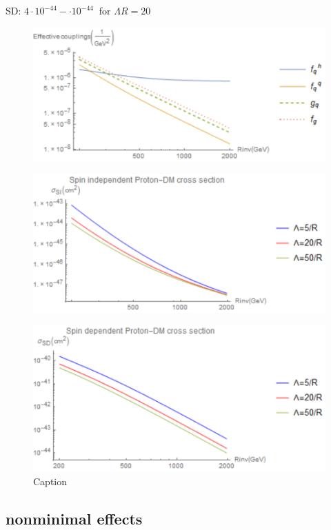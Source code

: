 \documentclass{article}
\begin{document}
SD: $4\cdot10^{-44}-\cdot10^{-44} \ $ for $\Lambda R=20$
\begin{figure}[H]
    \centering
    \includegraphics{cuoplingcontrib.pdf}
    \caption{}
    \label{couplingcontribution}
\end{figure}
\begin{figure}[H]
    \centering
    \includegraphics{SI52050.pdf}
    \caption{}
    \label{SI52050l}
\end{figure}
\begin{figure}[H]
    \centering
    \includegraphics{SD52050.pdf}
    \caption{Caption}
    \label{fig:my_label}
\end{figure}

\subsection{nonminimal effects}
\end{document}

